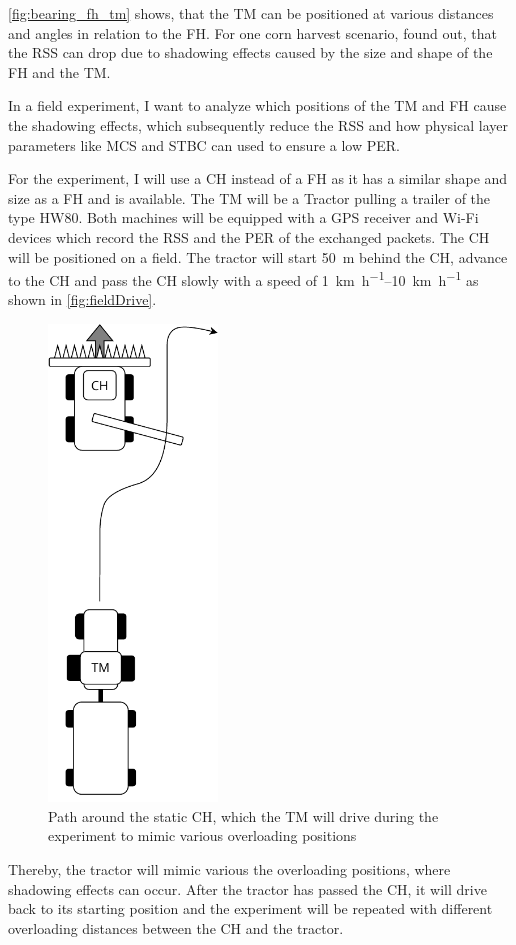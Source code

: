 \autoref{fig:bearing_fh_tm} shows, that the \ac{TM} can be positioned at various distances and angles in relation to the \ac{FH}.
For one corn harvest scenario, \textcite{klingler_agriculture_2018} found out, that the \ac{RSS} can drop due to
shadowing effects caused by the size and shape of the \ac{FH} and the \ac{TM}.

In a field experiment, I want to analyze which positions of the \ac{TM} and \ac{FH} cause the shadowing effects, which
subsequently reduce the \ac{RSS} and how physical layer parameters like \ac{MCS} and \ac{STBC} can used to ensure a low
\ac{PER}.

For the experiment, I will use a \ac{CH} instead of a \ac{FH} as it has a similar shape and size as a \ac{FH} and is available.
The \ac{TM} will be a Tractor pulling a trailer of the type HW80.
Both machines will be equipped with a \ac{GPS} receiver and Wi-Fi devices which record the \ac{RSS} and the \ac{PER} of the
exchanged packets.
The \ac{CH} will be positioned on a field.
The tractor will start \SI{50}{\metre} behind the \ac{CH}, advance to the \ac{CH} and pass the \ac{CH} slowly with a
speed of \SIrange{1}{10}{\kilo\metre\per\hour} as shown in \autoref{fig:fieldDrive}.
\begin{figure}[]%
	\centering
	\includegraphics[width=0.4\textwidth]{figures/FieldExperimentDrive}
	\caption{Path around the static \acf{CH}, which the \acf{TM} will drive during the experiment to mimic various overloading positions}%
\end{figure}
Thereby, the tractor will mimic various the overloading positions, where shadowing effects can occur. After the tractor has passed the \ac{CH},
it will drive back to its starting position and the experiment will be repeated with different overloading distances between the \ac{CH} and the tractor.

